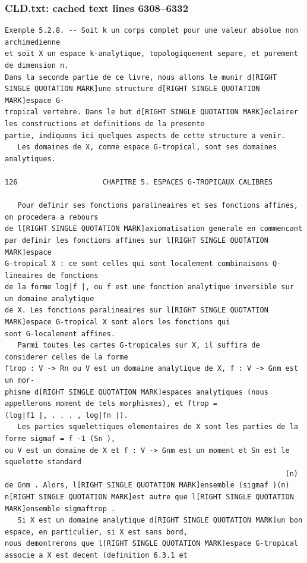 \documentclass[
  11pt,
]{article}
\begin{document}
\subsubsection{CLD.txt: cached text lines
6308--6332}\label{cld.txt-cached-text-lines-63086332}

\begin{lstlisting}
Exemple 5.2.8. -- Soit k un corps complet pour une valeur absolue non archimedienne
et soit X un espace k-analytique, topologiquement separe, et purement de dimension n.
Dans la seconde partie de ce livre, nous allons le munir d[RIGHT SINGLE QUOTATION MARK]une structure d[RIGHT SINGLE QUOTATION MARK]espace G-
tropical vertebre. Dans le but d[RIGHT SINGLE QUOTATION MARK]eclairer les constructions et definitions de la presente
partie, indiquons ici quelques aspects de cette structure a venir.
   Les domaines de X, comme espace G-tropical, sont ses domaines analytiques.

126                    CHAPITRE 5. ESPACES G-TROPICAUX CALIBRES

   Pour definir ses fonctions paralineaires et ses fonctions affines, on procedera a rebours
de l[RIGHT SINGLE QUOTATION MARK]axiomatisation generale en commencant par definir les fonctions affines sur l[RIGHT SINGLE QUOTATION MARK]espace
G-tropical X : ce sont celles qui sont localement combinaisons Q-lineaires de fonctions
de la forme log|f |, ou f est une fonction analytique inversible sur un domaine analytique
de X. Les fonctions paralineaires sur l[RIGHT SINGLE QUOTATION MARK]espace G-tropical X sont alors les fonctions qui
sont G-localement affines.
   Parmi toutes les cartes G-tropicales sur X, il suffira de considerer celles de la forme
ftrop : V -> Rn ou V est un domaine analytique de X, f : V -> Gnm est un mor-
phisme d[RIGHT SINGLE QUOTATION MARK]espaces analytiques (nous appellerons moment de tels morphismes), et ftrop =
(log|f1 |, . . . , log|fn |).
   Les parties squelettiques elementaires de X sont les parties de la forme sigmaf = f -1 (Sn ),
ou V est un domaine de X et f : V -> Gnm est un moment et Sn est le squelette standard
                                                                  (n)
de Gnm . Alors, l[RIGHT SINGLE QUOTATION MARK]ensemble (sigmaf )(n) n[RIGHT SINGLE QUOTATION MARK]est autre que l[RIGHT SINGLE QUOTATION MARK]ensemble sigmaftrop .
   Si X est un domaine analytique d[RIGHT SINGLE QUOTATION MARK]un bon espace, en particulier, si X est sans bord,
nous demontrerons que l[RIGHT SINGLE QUOTATION MARK]espace G-tropical associe a X est decent (definition 6.3.1 et
\end{lstlisting}
\end{document}

